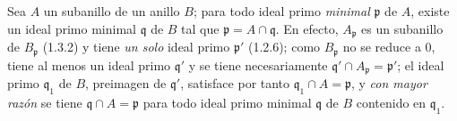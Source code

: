 \begin{env}[1.5.8]
\label{0.1.5.8-fr}
Sea $A$ un subanillo de un anillo $B$; para todo ideal primo
\emph{minimal} $\mathfrak p$ de $A$, existe un ideal primo minimal
$\mathfrak q$ de $B$ tal que $\mathfrak p=A\cap\mathfrak q$. En efecto,
$A_{\mathfrak p}$ es un subanillo de $B_{\mathfrak p}$ (1.3.2) y tiene
\emph{un solo} ideal primo $\mathfrak p'$ (1.2.6); como $B_{\mathfrak p}$ no se
reduce a $0$, tiene al menos un ideal primo $\mathfrak q'$ y se tiene
necesariamente $\mathfrak q'\cap A_{\mathfrak p}=\mathfrak p'$; el ideal primo
$\mathfrak q_1$ de $B$, preimagen de $\mathfrak q'$, satisface por tanto
$\mathfrak q_1\cap A=\mathfrak p$, y \emph{con mayor razón} se tiene
$\mathfrak q\cap A=\mathfrak p$ para todo ideal primo minimal $\mathfrak q$
de $B$ contenido en $\mathfrak q_1$.
\end{env}
